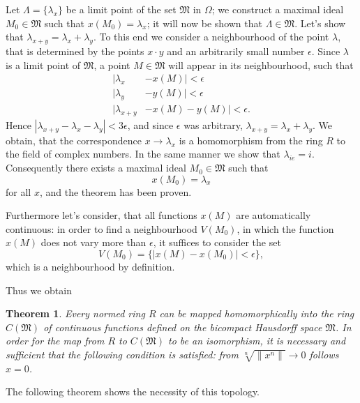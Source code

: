 \documentclass{article}
\newtheorem{theorem}{Theorem}
\theoremstyle{definition}
\begin{document}
Let $\Lambda=\{\lambda_x\}$ be a limit point of the set $\mathfrak{M}$ in $\Omega$; we construct a maximal ideal $M_0\in\mathfrak{M}$ such that $x(M_0)=\lambda_x$; it will now be shown that $\Lambda\in\mathfrak{M}$. Let's show that $\lambda_{x+y}=\lambda_x+\lambda_y$. To this end we consider a neighbourhood of the point $\lambda$, that is determined by the points $x\cdot y$ and an arbitrarily small number $\epsilon$. Since $\lambda$ is a limit point of $\mathfrak{M}$, a point $M\in\mathfrak{M}$ will appear in its neighbourhood, such that
\begin{align*}
  |\lambda_x &- x(M)| < \epsilon \\
  |\lambda_y &- y(M)| < \epsilon \\
  |\lambda_{x+y} &- x(M) - y(M)| < \epsilon.
\end{align*}
Hence $|\lambda_{x+y} - \lambda_x - \lambda_y| < 3\epsilon$, and since $\epsilon$ was arbitrary, $\lambda_{x+y} = \lambda_x + \lambda_y$. We obtain, that the correspondence $x\to\lambda_x$ is a homomorphism from the ring $R$ to the field of complex numbers. In the same manner we show that $\lambda_{ie} = i$. Consequently there exists a maximal ideal $M_0\in\mathfrak{M}$ such that $$x(M_0)=\lambda_x$$ for all $x$, and the theorem has been proven.

Furthermore let's consider, that all functions $x(M)$ are automatically continuous: in order to find a neighbourhood $V(M_0)$, in which the function $x(M)$ does not vary more than $\epsilon$, it suffices to consider the set
$$ V(M_0) = \{|x(M) - x(M_0)| < \epsilon\}, $$
which is a neighbourhood by definition.

Thus we obtain
\begin{theorem}
  Every normed ring $R$ can be mapped homomorphically into the ring $C(\mathfrak{M})$ of continuous functions defined on the bicompact Hausdorff space $\mathfrak{M}$. In order for the map from $R$ to $C(\mathfrak{M})$ to be an isomorphism, it is necessary and sufficient that the following condition is satisfied: from $\sqrt[n]{\|x^n\|} \to 0$ follows $x=0$.
\end{theorem}

The following theorem shows the necessity of this topology.
\end{document}
